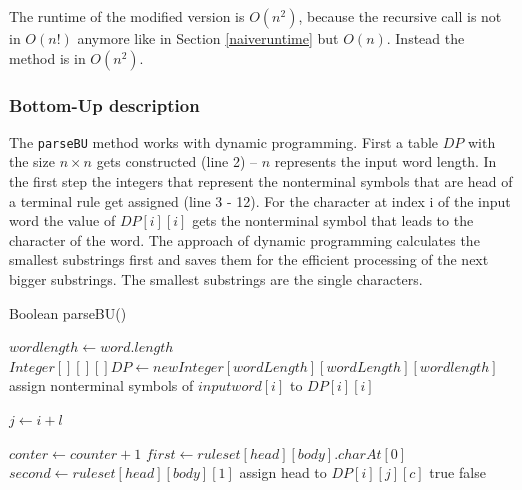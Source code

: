 \documentclass[a4paper, 11pt]{article}
\begin{document}
The runtime of the modified version is $O(n^2)$, because the recursive call is not in $O(n!)$ anymore like in Section \ref{naiveruntime} but $O(n)$. Instead the method is in $O(n^2)$.




\subsubsection{Bottom-Up description}
\label{bottomupdescription}

The \texttt{parseBU} method works with dynamic programming.
First a table $DP$ with the size $n \times n$ gets constructed (line 2) -- $n$ represents the input word length.
In the first step the integers that represent the nonterminal symbols that are head of a terminal rule get assigned (line 3 - 12). For the character at index i of the input word the value of $DP[i][i]$ gets the nonterminal symbol that leads to the character of the word.
The approach of dynamic programming calculates the smallest substrings first and saves them for the efficient processing of the next bigger substrings.  The smallest substrings are the single characters.


\begin{algorithm}[H]
\caption{Boolean parseBU()}\label{alg:cap}
\begin{algorithmic}[1]
\State $wordlength \gets word.length$ 
\State $Integer[][][] DP \gets new Integer[wordLength][wordLength][wordlength]$
\State assign nonterminal symbols of $inputword[i]$ to $DP[i][i]$
\EndIf
\EndFor

\State $j \gets i + l$

\State $conter \gets counter + 1$
\State $first \gets ruleset[head][body].charAt[0]$
\State $second \gets ruleset[head][body][1]$
\State assign head to $DP[i][j][c]$\footnotemark
\EndIf
\EndIf
\EndFor
\EndFor
\EndFor
\EndFor
\EndFor
{}
\State \Return true
\EndIf
\State \Return false
\end{algorithmic}
\end{algorithm}
\end{document}
